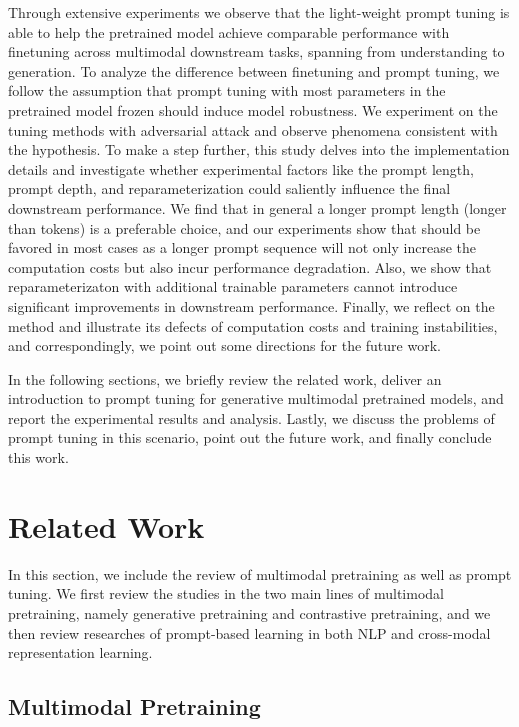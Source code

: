 \documentclass[11pt]{article}
\begin{document}
Through extensive experiments we observe that the light-weight prompt tuning is able to help the pretrained model achieve comparable performance with finetuning across  multimodal downstream tasks, spanning from understanding to generation.
To analyze the difference between finetuning and prompt tuning, we follow the assumption that prompt tuning with most parameters in the pretrained model frozen should induce model robustness. 
We experiment on the tuning methods with adversarial attack and observe phenomena consistent with the hypothesis. 
To make a step further, this study delves into the implementation details and investigate whether experimental factors like the prompt length, prompt depth, and reparameterization could saliently influence the final downstream performance. 
We find that in general a longer prompt length (longer than  tokens) is a preferable choice, and our experiments show that  should be favored in most cases as a longer prompt sequence will not only increase the computation costs but also incur performance degradation.
Also, we show that reparameterizaton with additional trainable parameters cannot introduce significant improvements in downstream performance. 
Finally, we reflect on the method and illustrate its defects of computation costs and training instabilities, and correspondingly, we point out some directions for the future work.

In the following sections, we briefly review the related work, deliver an introduction to prompt tuning for generative multimodal pretrained models, and report the experimental results and analysis. Lastly, we discuss the problems of prompt tuning in this scenario, point out the future work, and finally conclude this work.  
\section{Related Work}

In this section, we include the review of multimodal pretraining as well as prompt tuning. We first review the studies in the two main lines of multimodal pretraining, namely generative pretraining and contrastive pretraining, and we then review researches of prompt-based learning in both NLP and cross-modal representation learning. 


\subsection{Multimodal Pretraining}
\end{document}
